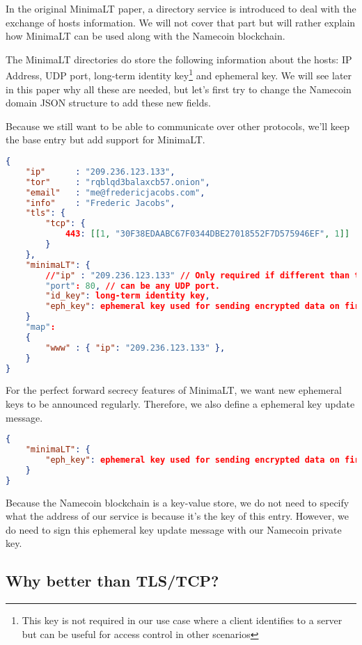 \documentclass{vldb}
\begin{document}
In the original MinimaLT paper, a directory service is introduced to deal with the exchange of hosts information. We will not cover that part but will rather explain how MinimaLT can be used along with the Namecoin blockchain.

The MinimaLT directories do store the following information about the hosts: IP Address, UDP port, long-term identity key\footnote{This key is not required in our use case where a client identifies to a server but can be useful for access control in other scenarios} and ephemeral key. We will see later in this paper why all these are needed, but let's first try to change the Namecoin domain JSON structure to add these new fields. 

Because we still want to be able to communicate over other protocols, we'll keep the base entry but add support for MinimaLT. 

\begin{lstlisting}[language=json,firstnumber=1]
{
    "ip"      : "209.236.123.133",
    "tor"     : "rqblqd3balaxcb57.onion",
    "email"   : "me@fredericjacobs.com",
    "info"    : "Frederic Jacobs",
    "tls": {
        "tcp": {
            443: [[1, "30F38EDAABC67F0344DBE27018552F7D575946EF", 1]]
        }
    },
    "minimaLT": {
        //"ip" : "209.236.123.133" // Only required if different than the default one
        "port": 80, // can be any UDP port.
        "id_key": long-term identity key,
        "eph_key": ephemeral key used for sending encrypted data on first RTT.
    }
    "map":
    {
        "www" : { "ip": "209.236.123.133" },
    }
}
\end{lstlisting}

For the perfect forward secrecy features of MinimaLT, we want new ephemeral keys to be announced regularly. Therefore, we also define a ephemeral key update message. 

\begin{lstlisting}[language=json,firstnumber=1]
{
    "minimaLT": {
        "eph_key": ephemeral key used for sending encrypted data on first RTT.
    }
}
\end{lstlisting}

Because the Namecoin blockchain is a key-value store, we do not need to specify what the address of our service is because it's the key of this entry. However, we do need to sign this ephemeral key update message with our Namecoin private key. 

\subsection{Why better than TLS/TCP?}
\end{document}
